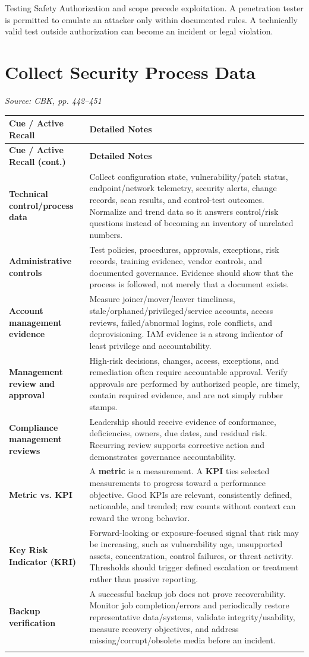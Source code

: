 \documentclass[10pt,letterpaper]{article}
\makeatletter
\newenvironment{cornell}{\rowcolors{2}{white}{notebg}\begin{longtable}{@{}>{\raggedright\arraybackslash\columncolor{cuebg}\color{navy}\bfseries}p{0.285\textwidth}>{\raggedright\arraybackslash}p{0.65\textwidth}@{}}\rowcolor{navy}\color{white}\textbf{Cue / Active Recall} & \color{white}\textbf{Detailed Notes}\\ \hline\endfirsthead\rowcolor{navy}\color{white}\textbf{Cue / Active Recall (cont.)} & \color{white}\textbf{Detailed Notes}\\ \hline\endhead}{\end{longtable}}
\newcommand{\noterow}[2]{#1 & #2\\\arrayrulecolor{line}\hline}\newcommand{\source}[1]{\par{\footnotesize\color{teal}\textit{Source: CBK, #1}}\par}
\makeatother
\begin{document}
\begin{exambox}{Testing Safety}
Authorization and scope precede exploitation. A penetration tester is permitted to emulate an attacker only within documented rules. A technically valid test outside authorization can become an incident or legal violation.
\end{exambox}

\section{\color{navy}Collect Security Process Data}
\source{pp. 442--451}
\begin{cornell}
\noterow{Technical control/process data}{Collect configuration state, vulnerability/patch status, endpoint/network telemetry, security alerts, change records, scan results, and control-test outcomes. Normalize and trend data so it answers control/risk questions instead of becoming an inventory of unrelated numbers.}
\noterow{Administrative controls}{Test policies, procedures, approvals, exceptions, risk records, training evidence, vendor controls, and documented governance. Evidence should show that the process is followed, not merely that a document exists.}
\noterow{Account management evidence}{Measure joiner/mover/leaver timeliness, stale/orphaned/privileged/service accounts, access reviews, failed/abnormal logins, role conflicts, and deprovisioning. IAM evidence is a strong indicator of least privilege and accountability.}
\noterow{Management review and approval}{High-risk decisions, changes, access, exceptions, and remediation often require accountable approval. Verify approvals are performed by authorized people, are timely, contain required evidence, and are not simply rubber stamps.}
\noterow{Compliance management reviews}{Leadership should receive evidence of conformance, deficiencies, owners, due dates, and residual risk. Recurring review supports corrective action and demonstrates governance accountability.}
\noterow{Metric vs. KPI}{A \textbf{metric} is a measurement. A \textbf{KPI} ties selected measurements to progress toward a performance objective. Good KPIs are relevant, consistently defined, actionable, and trended; raw counts without context can reward the wrong behavior.}
\noterow{Key Risk Indicator (KRI)}{Forward-looking or exposure-focused signal that risk may be increasing, such as vulnerability age, unsupported assets, concentration, control failures, or threat activity. Thresholds should trigger defined escalation or treatment rather than passive reporting.}
\noterow{Backup verification}{A successful backup job does not prove recoverability. Monitor job completion/errors and periodically restore representative data/systems, validate integrity/usability, measure recovery objectives, and address missing/corrupt/obsolete media before an incident.}

\end{cornell}
\end{document}
